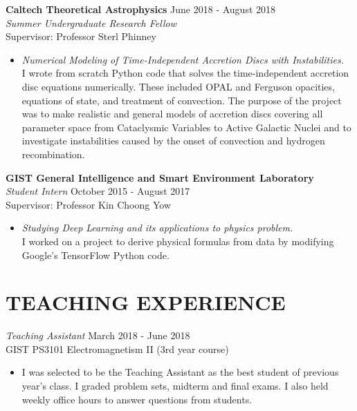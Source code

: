 \documentclass[margin, 10pt]{res} %
\begin{document}
\begin{resume}
{\bf Caltech Theoretical Astrophysics} \hfill June 2018 - August 2018 \\
{\sl Summer Undergraduate Research Fellow} \\
Supervisor: Professor Sterl Phinney
\begin{itemize}
\item[] {\sl Numerical Modeling of Time-Independent Accretion Discs with Instabilities.}\\
I wrote from scratch Python code that solves the time-independent accretion disc equations numerically. These included OPAL and Ferguson opacities, equations of state, and treatment of convection. The purpose of the project was to make realistic and general models of accretion discs covering all parameter space from Cataclysmic Variables to Active Galactic Nuclei and to investigate instabilities caused by the onset of convection and hydrogen recombination.
\end{itemize} 

{\bf GIST General Intelligence and Smart Environment Laboratory}\\
{\sl Student Intern} \hfill October 2015 - August 2017 \\
Supervisor: Professor Kin Choong Yow
\begin{itemize}
\item[] {\sl Studying Deep Learning and its applications to physics problem.}\\
I worked on a project to derive physical formulas from data by modifying Google's TensorFlow Python code.
\end{itemize} 

\section{TEACHING EXPERIENCE}

{\sl Teaching Assistant} \hfill March 2018 - June 2018 \\
GIST PS3101 Electromagnetism II (3rd year course)
\begin{itemize} \itemsep -2pt %
\item[] I was selected to be the Teaching Assistant as the best student of previous year's class. I graded problem sets, midterm and final exams. I also held weekly office hours to answer questions from students.
\end{itemize}



\end{resume}
\end{document}

